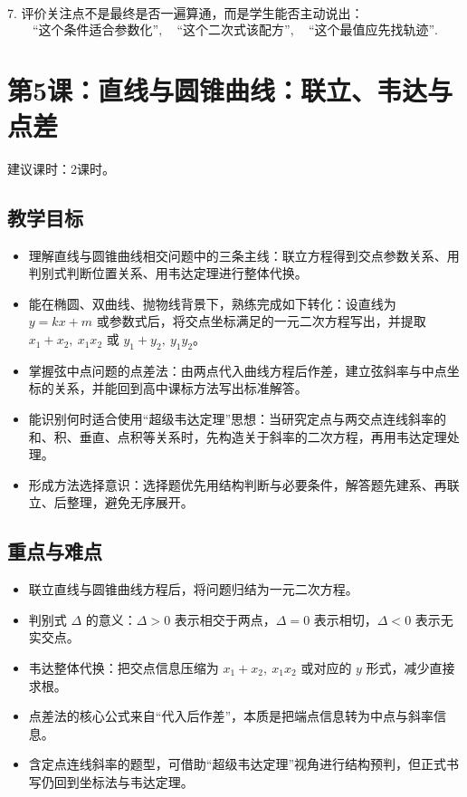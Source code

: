 \documentclass[UTF8,a4paper,11pt]{ctexart}
\begin{document}
7. 评价关注点不是最终是否一遍算通，而是学生能否主动说出：
\[
\text{“这个条件适合参数化”},\quad \text{“这个二次式该配方”},\quad \text{“这个最值应先找轨迹”}.
\]

\clearpage

\section{第5课：直线与圆锥曲线：联立、韦达与点差}

\noindent 建议课时：2课时。

\subsection*{教学目标}

\begin{itemize}

\item 理解直线与圆锥曲线相交问题中的三条主线：联立方程得到交点参数关系、用判别式判断位置关系、用韦达定理进行整体代换。

\item 能在椭圆、双曲线、抛物线背景下，熟练完成如下转化：设直线为 $y=kx+m$ 或参数式后，将交点坐标满足的一元二次方程写出，并提取 $x_1+x_2,\ x_1x_2$ 或 $y_1+y_2,\ y_1y_2$。

\item 掌握弦中点问题的点差法：由两点代入曲线方程后作差，建立弦斜率与中点坐标的关系，并能回到高中课标方法写出标准解答。

\item 能识别何时适合使用“超级韦达定理”思想：当研究定点与两交点连线斜率的和、积、垂直、点积等关系时，先构造关于斜率的二次方程，再用韦达定理处理。

\item 形成方法选择意识：选择题优先用结构判断与必要条件，解答题先建系、再联立、后整理，避免无序展开。

\end{itemize}

\subsection*{重点与难点}

\begin{itemize}

\item 联立直线与圆锥曲线方程后，将问题归结为一元二次方程。

\item 判别式 $\Delta$ 的意义：$\Delta>0$ 表示相交于两点，$\Delta=0$ 表示相切，$\Delta<0$ 表示无实交点。

\item 韦达整体代换：把交点信息压缩为 $x_1+x_2,\ x_1x_2$ 或对应的 $y$ 形式，减少直接求根。

\item 点差法的核心公式来自“代入后作差”，本质是把端点信息转为中点与斜率信息。

\item 含定点连线斜率的题型，可借助“超级韦达定理”视角进行结构预判，但正式书写仍回到坐标法与韦达定理。

\end{itemize}
\end{document}
